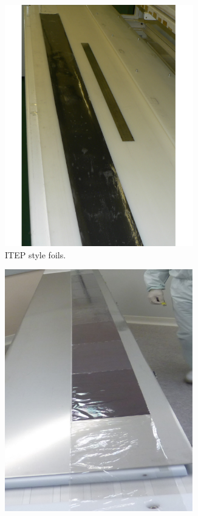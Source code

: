 \begin{figure}[h!]
\centering
\begin{subfigure}[t]{0.49\textwidth}
\centering
\includegraphics[width=0.9\textwidth]{SNdemonstrator/fig_SNdemonstrator/ITEP_source_foils.png}
\captionsetup{justification=centering}
\caption{ITEP style foils.
\label{subfig:ITEP_foils}}
\end{subfigure}
\hfill
\begin{subfigure}[t]{0.49\textwidth}
\centering
\includegraphics[width=0.9\textwidth]{SNdemonstrator/fig_SNdemonstrator/LAPP_source_foils.png}

\end{subfigure}
\end{figure}

